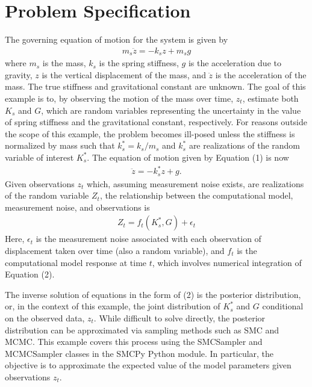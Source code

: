 \documentclass[letterpaper,10pt,english]{sphinxmanual}
\begin{document}
\section{Problem Specification}
\label{\detokenize{example:problem-specification}}
The governing equation of motion for the system is given by
\begin{equation}\label{equation:example:springmass}
\begin{split}m_s \ddot{z}  = -k_s z + m_s g\end{split}
\end{equation}
where \(m_s\) is the mass, \(k_s\) is the spring stiffness, \(g\)
is the acceleration due to gravity, \(z\) is the vertical displacement of
the mass, and \(\ddot{z}\) is the acceleration of the mass. The true
stiffness and gravitational constant are unknown. The goal of this example is
to, by observing the motion of the mass over time, \(z_t\), estimate both
\(K_s\) and \(G\), which are random variables representing the
uncertainty in the value of spring stiffness and the gravitational constant,
respectively. For reasons outside the scope of this example, the problem
becomes ill-posed unless the stiffness is normalized by mass such that
\(k_s^* = k_s/m_s\) and \(k_s^*\) are realizations of the random
variable of interest \(K_s^*\). The equation of motion given by Equation
(1) is now
\begin{equation}\label{equation:example:springmass_mod}
\begin{split}\ddot{z}  = -k_s^* z + g.\end{split}
\end{equation}
Given observations \(z_t\) which, assuming measurement noise exists, are realizations of the random variable \(Z_t\), the relationship between the computational model, measurement noise, and observations is
\begin{equation}\label{equation:example:springmass_stat_model}
\begin{split}Z_t = f_t(K_s^*, G) + \epsilon_t\end{split}
\end{equation}
Here, \(\epsilon_t\) is the measurement noise associated with each observation of displacement taken over time (also a random variable), and \(f_t\) is the computational model response at time \(t\), which involves numerical integration of Equation (2).

The inverse solution of equations in the form of (2) is the posterior
distribution, or, in the context of this example, the joint distribution of
\(K_s^*\) and \(G\) conditional on the observed data, \(z_t\). While
difficult to solve directly, the posterior distribution can be approximated via
sampling methods such as SMC and MCMC. This example covers this process using
the SMCSampler and MCMCSampler classes in the SMCPy Python module. In
particular, the objective is to approximate the expected value of the model
parameters given observations \(z_t\).
\end{document}
